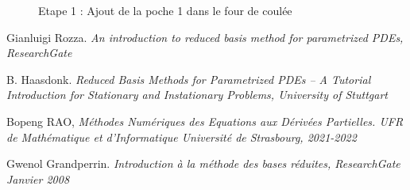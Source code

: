 \documentclass[12pt]{article}
\begin{document}
\begin{figure}[htbp]
    \caption{Etape 1 : Ajout de la poche 1 dans le four de coulée }
    \label{fig:fusion-coulee}
\end{figure}




\begin{thebibliography}{9}

Gianluigi Rozza.  \emph{An introduction to reduced basis method for parametrized PDEs, ResearchGate}

B. Haasdonk.  \emph{Reduced Basis Methods for Parametrized PDEs –
A Tutorial Introduction for Stationary and
Instationary Problems, University of Stuttgart  } 



Bopeng RAO,  \emph{ Méthodes Numériques
des Equations aux Dérivées Partielles. UFR de Mathématique et d’Informatique
Université de Strasbourg, 2021-2022 }

Gwenol Grandperrin.  \emph{Introduction à la méthode des bases réduites, ResearchGate Janvier 2008 }

\end{thebibliography}
\end{document}
